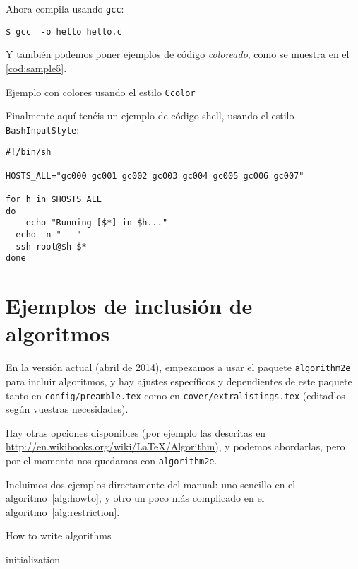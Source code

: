 \noindent
Ahora compila usando \texttt{gcc}:


\begin{lstlisting}[style=console, numbers=none]
$ gcc  -o hello hello.c
\end{lstlisting}

Y también podemos poner ejemplos de código \textit{coloreado}, como se
muestra en el \ref{cod:sample5}.

\begin{codefloat}

\caption{Ejemplo con colores usando el estilo \texttt{Ccolor}}
\label{cod:sample5}
\end{codefloat}

Finalmente aquí tenéis un ejemplo de código shell, usando el estilo
\texttt{BashInputStyle}:

\begin{lstlisting}[style=BashInputStyle, numbers=none]
#!/bin/sh

HOSTS_ALL="gc000 gc001 gc002 gc003 gc004 gc005 gc006 gc007"

for h in $HOSTS_ALL
do
	echo "Running [$*] in $h..."
  echo -n "   "
  ssh root@$h $*
done
\end{lstlisting}

\section{Ejemplos de inclusión de algoritmos}
\label{sec:algoritmos}

En la versión actual (abril de 2014), empezamos a usar el paquete
\texttt{algorithm2e} para incluir algoritmos, y hay ajustes específicos
y dependientes de este paquete tanto en \texttt{config/preamble.tex}
como en \texttt{cover/extralistings.tex} (editadlos según vuestras
necesidades). 

Hay otras opciones disponibles (por ejemplo las descritas en
\url{http://en.wikibooks.org/wiki/LaTeX/Algorithm}), y podemos
abordarlas, pero por el momento nos quedamos con \texttt{algorithm2e}.

Incluimos dos ejemplos directamente del manual: uno sencillo en el
algoritmo~\ref{alg:howto}, y otro un poco más complicado en el
algoritmo~\ref{alg:restriction}.

\begin{algorithm}[H]
 \caption{How to write algorithms}
 \label{alg:howto}
 initialization\;
\end{algorithm}


